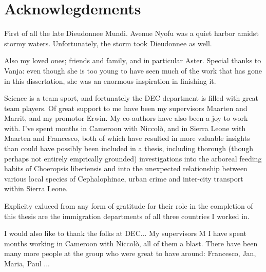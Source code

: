 \chapter*{Acknowlegdements}
First of all the late Dieudonnee Mundi. Avenue Nyofu was a quiet harbor amidst stormy waters. Unfortunately, the storm took Dieudonnee as well.


Also my loved ones; friends and family, and in particular Aster. Special thanks to Vanja: even though she is too young to have seen much of the work that has gone in this dissertation, she was an enormous inspiration in finishing it.



Science is a team sport, and fortunately the DEC department is filled with great team players. Of great support to me have been my supervisors Maarten and Marrit, and my promotor Erwin. My co-authors have also been a joy to work with. I've spent months in Cameroon with Niccolò, and in Sierra Leone with Maarten and Francesco, both of which have resulted in more valuable insights than could have possibly been included in a thesis, including thorough (though perhaps not entirely emprically grounded) investigations into the arboreal feeding habits of Choeropsis liberiensis and into the unexpected relationship between various local species of Cephalophinae, urban crime and inter-city transport within Sierra Leone. 


Explicity exluced from any form of gratitude for their role in the completion of this thesis are the immigration departments of all three countries I worked in.

I would also like to thank the folks at DEC... My supervisors M I have spent months working in Cameroon with Niccolò, all of them a blast. There have been many more people at the group who were great to have around: Francesco, Jan, Maria, Paul ...




